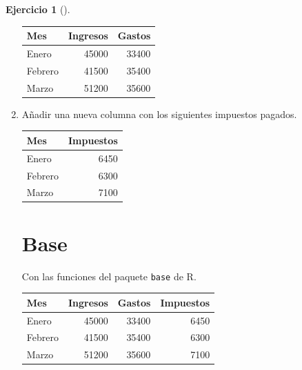 \documentclass[
  spanish,
  a4paper,
]{scrreport}
\newenvironment{Shaded}{\begin{snugshade}}{\end{snugshade}}
\newcommand{\DecValTok}[1]{\textcolor[rgb]{0.68,0.00,0.00}{#1}}
\newcommand{\FunctionTok}[1]{\textcolor[rgb]{0.28,0.35,0.67}{#1}}
\newcommand{\NormalTok}[1]{\textcolor[rgb]{0.00,0.23,0.31}{#1}}
\newcommand{\OtherTok}[1]{\textcolor[rgb]{0.00,0.23,0.31}{#1}}
\newcommand{\SpecialCharTok}[1]{\textcolor[rgb]{0.37,0.37,0.37}{#1}}
\theoremstyle{definition}
\newtheorem{exercise}{Ejercicio}[chapter]
\theoremstyle{remark}
\begin{document}
\begin{exercise}[]
\begin{enumerate}
\begin{tcolorbox}
  \begin{longtable}[]{@{}lrr@{}}
  \toprule\noalign{}
  Mes & Ingresos & Gastos \\
  \midrule\noalign{}
  \endhead
  \bottomrule\noalign{}
  \endlastfoot
  Enero & 45000 & 33400 \\
  Febrero & 41500 & 35400 \\
  Marzo & 51200 & 35600 \\
  \end{longtable}

  \end{tcolorbox}
\item
  Añadir una nueva columna con los siguientes impuestos pagados.

  \begin{longtable}[]{@{}lr@{}}
  \toprule\noalign{}
  Mes & Impuestos \\
  \midrule\noalign{}
  \endhead
  \bottomrule\noalign{}
  \endlastfoot
  Enero & 6450 \\
  Febrero & 6300 \\
  Marzo & 7100 \\
  \end{longtable}

  \begin{tcolorbox}[enhanced jigsaw, breakable, leftrule=.75mm, toptitle=1mm, rightrule=.15mm, opacitybacktitle=0.6, left=2mm, colframe=quarto-callout-tip-color-frame, titlerule=0mm, toprule=.15mm, opacityback=0, bottomtitle=1mm, coltitle=black, colbacktitle=quarto-callout-tip-color!10!white, title=\textcolor{quarto-callout-tip-color}{\faLightbulb}\hspace{0.5em}{Solución}, arc=.35mm, bottomrule=.15mm, colback=white]

  \section{Base}

  Con las funciones del paquete \texttt{base} de R.

\begin{Shaded}
\end{Shaded}

  \begin{longtable}[]{@{}lrrr@{}}
  \toprule\noalign{}
  Mes & Ingresos & Gastos & Impuestos \\
  \midrule\noalign{}
  \endhead
  \bottomrule\noalign{}
  \endlastfoot
  Enero & 45000 & 33400 & 6450 \\
  Febrero & 41500 & 35400 & 6300 \\
  Marzo & 51200 & 35600 & 7100 \\
  \end{longtable}


\end{tcolorbox}
\end{enumerate}
\end{exercise}
\end{document}
